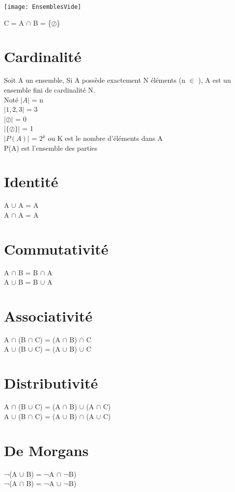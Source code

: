\texttt{[image: EnsemblesVide]}
\vspace{3mm} %

C = A $\cap$ B = \{$\oslash$\}

\newpage
\section{Cardinalité}

Soit A un ensemble, Si A possède exactement N éléments (n $\in$ \N), A est un ensemble fini de cardinalité N.\\

Noté $|A|$ = n \\

$|1,2,3|$ = 3 \\

$|\oslash|$ = 0 \\

$|\{\oslash\}|$ = 1 \\

$|P(A)|$ = 2$^{k}$ ou K est le nombre d'éléments dans A \\

P(A) est l'ensemble des parties \\

\section{Identité}

A $\cup$ A = A \\
A $\cap$ A = A \\

\section{Commutativité}

A $\cap$ B  = B $\cap$ A \\
A $\cup$ B  = B $\cup$ A \\

\section{Associativité}

A $\cap$ (B $\cap$ C) = (A $\cap$ B) $\cap$ C \\
A $\cup$ (B $\cup$ C) = (A $\cup$ B) $\cup$ C \\

\section{Distributivité}

A $\cap$ (B $\cup$ C) = (A $\cap$ B) $\cup$ (A $\cap$ C) \\
A $\cup$ (B $\cap$ C) = (A $\cup$ B) $\cap$ (A $\cup$ C) \\

\section{De Morgans}

¬(A $\cup$ B) = ¬A $\cap$ ¬B) \\
¬(A $\cap$ B) = ¬A $\cup$ ¬B) \\
